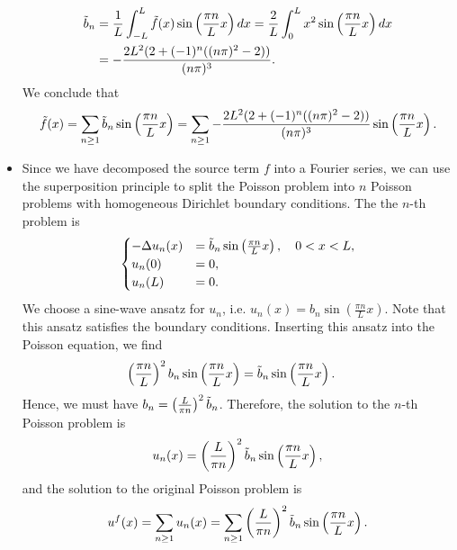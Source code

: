 \documentclass[11pt]{article}
\begin{document}
\begin{solution}
\begin{itemize}
        \begin{align*}
            \Tilde{b}_n &= \frac{1}{L} \int_{-L}^L \Tilde{f}(x) \sin\left(\frac{\pi n}{L} x\right) dx = \frac{2}{L} \int_{0}^L x^2 \sin\left(\frac{\pi n}{L} x\right) dx\\
            &= -\frac{2 L^2 (2 + (-1)^n ((n \pi)^2 - 2))}{(n\pi)^3}.
        \end{align*}
        We conclude that
        \begin{align*}
            \Tilde{f}(x) = \sum_{n \geq 1} \Tilde{b}_n \sin\left(\frac{\pi n}{L} x\right) = \sum_{n \geq 1} -\frac{2 L^2 (2 + (-1)^n ((n \pi)^2 - 2))}{(n\pi)^3} \sin\left(\frac{\pi n}{L} x\right).
        \end{align*}
        \item Since we have decomposed the source term $f$ into a Fourier series, we can use the superposition principle to split the Poisson problem into $n$ Poisson problems with homogeneous Dirichlet boundary conditions. The the $n$-th problem is
        \begin{align*}
            \begin{cases}
            -\Delta u_n(x) &= \Tilde{b}_n \sin\left(\frac{\pi n}{L} x\right), \quad 0 < x < L,\\
            u_n(0) &= 0,\\
            u_n(L) &= 0.
            \end{cases}
        \end{align*}
        We choose a sine-wave ansatz for $u_n$, i.e. $u_n(x) = b_n \sin\left(\frac{\pi n}{L} x\right)$. Note that this ansatz satisfies the boundary conditions.
         Inserting this ansatz into the Poisson equation, we find
        \begin{align*}
            \left(\frac{\pi n}{L} \right)^2 b_n \sin\left(\frac{\pi n}{L} x\right) &= \Tilde{b}_n \sin\left(\frac{\pi n}{L} x\right).
        \end{align*}
        Hence, we must have $b_n = \left(\frac{L}{\pi n}\right)^2 \Tilde{b}_n$. Therefore, the solution to the $n$-th Poisson problem is
        \begin{align*}
            u_n(x) = \left(\frac{L}{\pi n}\right)^2 \Tilde{b}_n \sin\left(\frac{\pi n}{L} x\right),
        \end{align*}
        and the solution to the original Poisson problem is
        \begin{align*}
            u^f(x) = \sum_{n \geq 1} u_n(x) = \sum_{n \geq 1} \left(\frac{L}{\pi n}\right)^2 \Tilde{b}_n \sin\left(\frac{\pi n}{L} x\right).
        \end{align*}

    \end{itemize}
\end{solution}
\end{document}
